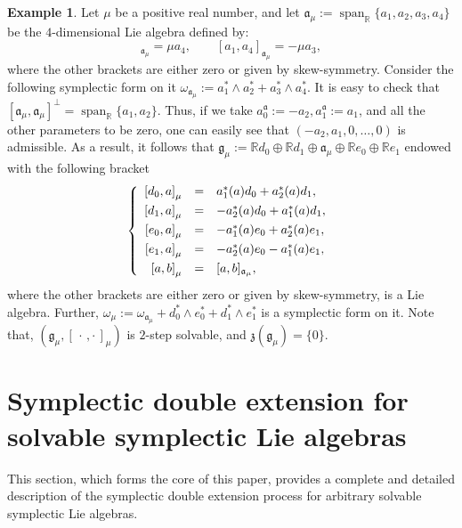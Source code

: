 \documentclass[final,1p,times,nopreprintline]{elsarticle}
\theoremstyle{definition}
\newtheorem{example}{Example}[section]
\numberwithin{equation}{section}
\newcommand{\rel}{\mathbb{R}}
\newcommand{\w}{\omega}
\newcommand{\g}{\mathfrak{g}}
\newcommand{\ai}{\mathfrak{a}}
\newcommand{\Span}{\operatorname{span}}
\numberwithin{equation}{section}
\newcommand{\cro}{[\,\cdot\,,\cdot\,]}
\begin{document}
\begin{example}
	Let $\mu$ be a positive real number, and let $\ai_\mu:=\Span_\rel\{a_1,a_2,a_3,a_4\}$ be the $4$-dimensional Lie algebra defined by: 
	\begin{equation*}
		[a_1,a_3]_{\ai_\mu}=\mu a_4,\qquad [a_1,a_4]_{\ai_\mu}=-\mu a_3,
	\end{equation*} 
	where the other brackets are either zero or given by skew-symmetry. Consider the following symplectic form on it $\w_{\ai_\mu}:=a_1^*\wedge a_2^*+a_3^*\wedge a_4^*$. It is easy to check that $[\ai_\mu,\ai_\mu]^\perp=\Span_\rel\{a_1,a_2\}$. Thus, if we take $a^\ai_0:=-a_2,a^\ai_1:=a_1$, and all the other parameters to be zero, one can easily see that $(-a_2,a_1,0,\ldots,0)$ is admissible. As a result, it follows that $\g_\mu:=\rel d_0\oplus\rel d_1\oplus\ai_\mu\oplus\rel e_0\oplus\rel e_1$ endowed with the following bracket
	\begin{equation*}
		\left\{
		\begin{array}{r c l}\vspace{1mm}
\left[d_0,a\right]_\mu&=&a_1^*(a)d_0+a_2^*(a)d_1,\\\vspace{1mm}
		\left[d_1,a\right]_\mu&=&-a_2^*(a)d_0+a_1^*(a)d_1,\\\vspace{1mm}			\left[e_0,a\right]_\mu&=&-a_1^*(a)e_0+a_2^*(a)e_1,\\\vspace{1mm}
	\left[e_1,a\right]_\mu&=&-a_2^*(a)e_0-a_1^*(a)e_1,\\
	\left[a,b\right]_\mu&=&[a,b]_{\ai_\mu},
		\end{array}
		\right.\\
	\end{equation*}
	where the other brackets are either zero or given by skew-symmetry, is a Lie algebra. Further, $\w_\mu:=\w_{\ai_\mu}+d_0^*\wedge e_0^*+d_1^*\wedge e_1^*$ is a symplectic form on it. Note that, $(\g_\mu,\cro_\mu)$ is $2$-step solvable, and $\mathfrak{z}(\g_\mu)=\{0\}$.
\end{example}

\section{Symplectic double extension for solvable symplectic Lie algebras}\label{Section3p}

This section, which forms the core of this paper, provides a complete and detailed description of the symplectic double extension process for arbitrary solvable symplectic Lie algebras.
\end{document}
